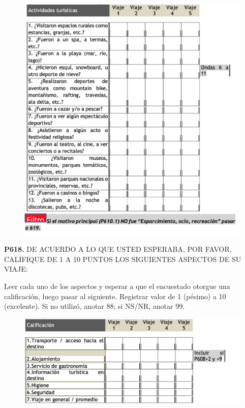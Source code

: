 \documentclass[
  openany]{book}
\begin{document}
\begin{figure}

{\centering \includegraphics[width=1\linewidth]{imagenes/figura6-227} 

}

\end{figure}

\textbf{P618.} DE ACUERDO A LO QUE USTED ESPERABA, POR FAVOR, CALIFIQUE DE 1 A 10 PUNTOS LOS SIGUIENTES ASPECTOS DE SU VIAJE:

Leer cada uno de los aspectos y esperar a que el encuestado otorgue una calificación, luego pasar al siguiente. Registrar valor de 1 (pésimo) a 10 (excelente). Si no utilizó, anotar 88; si NS/NR, anotar 99.

\begin{figure}

{\centering \includegraphics[width=1\linewidth]{imagenes/figura6-228} 

}

\end{figure}
\end{document}

